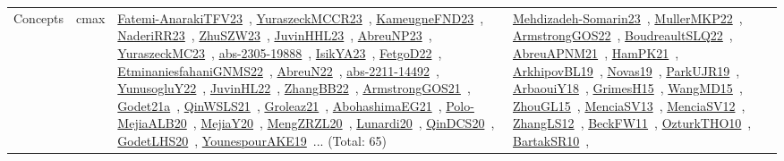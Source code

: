 {\begin{longtable}{lp{3cm}>{\raggedright\arraybackslash}p{6cm}>{\raggedright\arraybackslash}p{6cm}>{\raggedright\arraybackslash}p{8cm}}
Concepts & cmax & \href{../works/Fatemi-AnarakiTFV23.pdf}{Fatemi-AnarakiTFV23}~\cite{Fatemi-AnarakiTFV23}, \href{../works/YuraszeckMCCR23.pdf}{YuraszeckMCCR23}~\cite{YuraszeckMCCR23}, \href{../works/KameugneFND23.pdf}{KameugneFND23}~\cite{KameugneFND23}, \href{../works/NaderiRR23.pdf}{NaderiRR23}~\cite{NaderiRR23}, \href{../works/ZhuSZW23.pdf}{ZhuSZW23}~\cite{ZhuSZW23}, \href{../works/JuvinHHL23.pdf}{JuvinHHL23}~\cite{JuvinHHL23}, \href{../works/AbreuNP23.pdf}{AbreuNP23}~\cite{AbreuNP23}, \href{../works/YuraszeckMC23.pdf}{YuraszeckMC23}~\cite{YuraszeckMC23}, \href{../works/abs-2305-19888.pdf}{abs-2305-19888}~\cite{abs-2305-19888}, \href{../works/IsikYA23.pdf}{IsikYA23}~\cite{IsikYA23}, \href{../works/FetgoD22.pdf}{FetgoD22}~\cite{FetgoD22}, \href{../works/EtminaniesfahaniGNMS22.pdf}{EtminaniesfahaniGNMS22}~\cite{EtminaniesfahaniGNMS22}, \href{../works/AbreuN22.pdf}{AbreuN22}~\cite{AbreuN22}, \href{../works/abs-2211-14492.pdf}{abs-2211-14492}~\cite{abs-2211-14492}, \href{../works/YunusogluY22.pdf}{YunusogluY22}~\cite{YunusogluY22}, \href{../works/JuvinHL22.pdf}{JuvinHL22}~\cite{JuvinHL22}, \href{../works/ZhangBB22.pdf}{ZhangBB22}~\cite{ZhangBB22}, \href{../works/ArmstrongGOS21.pdf}{ArmstrongGOS21}~\cite{ArmstrongGOS21}, \href{../works/Godet21a.pdf}{Godet21a}~\cite{Godet21a}, \href{../works/QinWSLS21.pdf}{QinWSLS21}~\cite{QinWSLS21}, \href{../works/Groleaz21.pdf}{Groleaz21}~\cite{Groleaz21}, \href{../works/AbohashimaEG21.pdf}{AbohashimaEG21}~\cite{AbohashimaEG21}, \href{../works/Polo-MejiaALB20.pdf}{Polo-MejiaALB20}~\cite{Polo-MejiaALB20}, \href{../works/MejiaY20.pdf}{MejiaY20}~\cite{MejiaY20}, \href{../works/MengZRZL20.pdf}{MengZRZL20}~\cite{MengZRZL20}, \href{../works/Lunardi20.pdf}{Lunardi20}~\cite{Lunardi20}, \href{../works/QinDCS20.pdf}{QinDCS20}~\cite{QinDCS20}, \href{../works/GodetLHS20.pdf}{GodetLHS20}~\cite{GodetLHS20}, \href{../works/YounespourAKE19.pdf}{YounespourAKE19}~\cite{YounespourAKE19}... (Total: 65) & \href{../works/Mehdizadeh-Somarin23.pdf}{Mehdizadeh-Somarin23}~\cite{Mehdizadeh-Somarin23}, \href{../works/MullerMKP22.pdf}{MullerMKP22}~\cite{MullerMKP22}, \href{../works/ArmstrongGOS22.pdf}{ArmstrongGOS22}~\cite{ArmstrongGOS22}, \href{../works/BoudreaultSLQ22.pdf}{BoudreaultSLQ22}~\cite{BoudreaultSLQ22}, \href{../works/AbreuAPNM21.pdf}{AbreuAPNM21}~\cite{AbreuAPNM21}, \href{../works/HamPK21.pdf}{HamPK21}~\cite{HamPK21}, \href{../works/ArkhipovBL19.pdf}{ArkhipovBL19}~\cite{ArkhipovBL19}, \href{../works/Novas19.pdf}{Novas19}~\cite{Novas19}, \href{../works/ParkUJR19.pdf}{ParkUJR19}~\cite{ParkUJR19}, \href{../works/ArbaouiY18.pdf}{ArbaouiY18}~\cite{ArbaouiY18}, \href{../works/GrimesH15.pdf}{GrimesH15}~\cite{GrimesH15}, \href{../works/WangMD15.pdf}{WangMD15}~\cite{WangMD15}, \href{../works/ZhouGL15.pdf}{ZhouGL15}~\cite{ZhouGL15}, \href{../works/MenciaSV13.pdf}{MenciaSV13}~\cite{MenciaSV13}, \href{../works/MenciaSV12.pdf}{MenciaSV12}~\cite{MenciaSV12}, \href{../works/ZhangLS12.pdf}{ZhangLS12}~\cite{ZhangLS12}, \href{../works/BeckFW11.pdf}{BeckFW11}~\cite{BeckFW11}, \href{../works/OzturkTHO10.pdf}{OzturkTHO10}~\cite{OzturkTHO10}, \href{../works/BartakSR10.pdf}{BartakSR10}~\cite{BartakSR10}, 
\end{longtable}}
